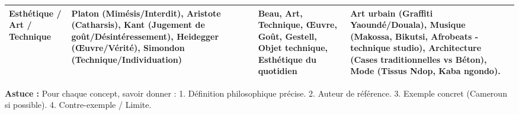 \documentclass[11pt]{article}
\newcommand{\cle}[1]{{\popxbold\color{popdark}#1}}
\begin{document}
\begin{aretenir}
\begin{center}
\begin{tabularx}{\linewidth}{|l|X|X|X|}
\cle{Esthétique / Art / Technique} & \textbf{Platon} (Mimésis/Interdit), \textbf{Aristote} (Catharsis), \textbf{Kant} (Jugement de goût/Désintéressement), \textbf{Heidegger} (Œuvre/Vérité), \textbf{Simondon} (Technique/Individuation) & \cle{Beau}, \cle{Art}, \cle{Technique}, \cle{Œuvre}, \cle{Goût}, \cle{Gestell}, \cle{Objet technique}, \cle{Esthétique du quotidien} & \cle{Art urbain} (Graffiti Yaoundé/Douala), \cle{Musique} (Makossa, Bikutsi, Afrobeats - technique studio), \cle{Architecture} (Cases traditionnelles vs Béton), \cle{Mode} (Tissus Ndop, Kaba ngondo). \\ \hline
\end{tabularx}
\end{center}
\textbf{Astuce :} Pour chaque concept, savoir donner : 1. Définition philosophique précise. 2. Auteur de référence. 3. Exemple concret (Cameroun si possible). 4. Contre-exemple / Limite.
\end{aretenir}
\end{document}
